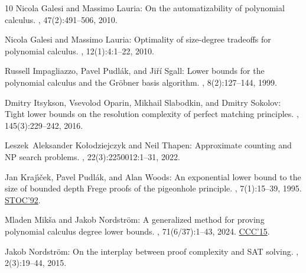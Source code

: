 \begin{thebibliography}{10}
{\sc Nicola Galesi and Massimo Lauria}: On the automatizability of polynomial
  calculus.
, 47(2):491--506, 2010.
\newblock [\epfmtdoi{10.1007/s00224-009-9195-5}]

{\sc Nicola Galesi and Massimo Lauria}: Optimality of size-degree tradeoffs for
  polynomial calculus.
, 12(1):4:1--22, 2010.
\newblock [\epfmtdoi{10.1145/1838552.1838556}]

{\sc Russell Impagliazzo, Pavel Pudl{\'a}k, and Ji{\v{r}}{\'i} Sgall}: Lower
  bounds for the polynomial calculus and the {G}r{\"o}bner basis algorithm.
, 8(2):127--144, 1999.
\newblock [\epfmtdoi{10.1007/s000370050024}]

{\sc Dmitry Itsykson, Vsevolod Oparin, Mikhail Slabodkin, and Dmitry Sokolov}:
  Tight lower bounds on the resolution complexity of perfect matching
  principles.
, 145(3):229--242, 2016.
\newblock [\epfmtdoi{10.3233/FI-2016-1358}]

{\sc Leszek~Aleksander Ko{\l}odziejczyk and Neil Thapen}: Approximate counting
  and {NP} search problems.
, 22(3):2250012:1--31, 2022.
\newblock [\epfmtdoi{10.1142/S021906132250012X}]

{\sc Jan Kraj\'{\i}\v{c}ek, Pavel Pudl\'{a}k, and Alan Woods}: An exponential
  lower bound to the size of bounded depth {F}rege proofs of the pigeonhole
  principle.
, 7(1):15--39, 1995.
\newblock \prelim \href{https://doi.org/10.1145/129712.129733}{STOC'92}.

{\sc Mladen Mik\v{s}a and Jakob Nordstr\"om}: A generalized method for proving
  polynomial calculus degree lower bounds.
, 71(6/37):1--43, 2024.
\newblock \prelim \href{https://doi.org/10.4230/LIPIcs.CCC.2015.467}{CCC'15}.
\newblock [\epfmtdoi{10.1145/3675668}]

{\sc Jakob Nordstr{\"{o}}m}: On the interplay between proof complexity and
  {SAT} solving.
, 2(3):19--44, 2015.
\newblock [\epfmtdoi{10.1145/2815493.2815497}]


\end{thebibliography}
